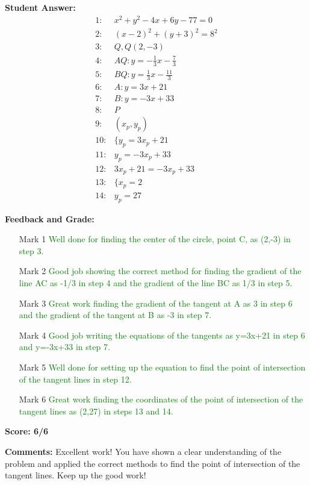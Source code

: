 \documentclass{article}
\begin{document}
\textbf{Student Answer:}
\begin{align*}
1: & x^2+y^2-4x+6y-77=0 \\
2: & (x-2)^2+(y+3)^2=8^2 \\
3: & Q,Q(2,-3) \\
4: & AQ:y=-\frac{1}{3}x-\frac{7}{3} \\
5: & BQ:y=\frac{1}{3}x-\frac{11}{3} \\
6: & A:y=3x+21 \\
7: & B:y=-3x+33 \\
8: & P \\
9: & (x_p,y_p) \\
10: & \{y_p=3x_p+21 \\
11: & y_p=-3x_p+33 \\
12: & 3x_p+21=-3x_p+33 \\
13: & \{x_p=2 \\
14: & y_p=27
\end{align*}

\textbf{Feedback and Grade:}
\begin{itemize}
\item[Mark 1] \textcolor{green}{Well done for finding the center of the circle, point C, as (2,-3) in step 3.}
\item[Mark 2] \textcolor{green}{Good job showing the correct method for finding the gradient of the line AC as -1/3 in step 4 and the gradient of the line BC as 1/3 in step 5.}
\item[Mark 3] \textcolor{green}{Great work finding the gradient of the tangent at A as 3 in step 6 and the gradient of the tangent at B as -3 in step 7.}
\item[Mark 4] \textcolor{green}{Good job writing the equations of the tangents as y=3x+21 in step 6 and y=-3x+33 in step 7.}
\item[Mark 5] \textcolor{green}{Well done for setting up the equation to find the point of intersection of the tangent lines in step 12.}
\item[Mark 6] \textcolor{green}{Great work finding the coordinates of the point of intersection of the tangent lines as (2,27) in steps 13 and 14.}
\end{itemize}

\textbf{Score: 6/6}

\textbf{Comments:} Excellent work! You have shown a clear understanding of the problem and applied the correct methods to find the point of intersection of the tangent lines. Keep up the good work!
\end{document}
